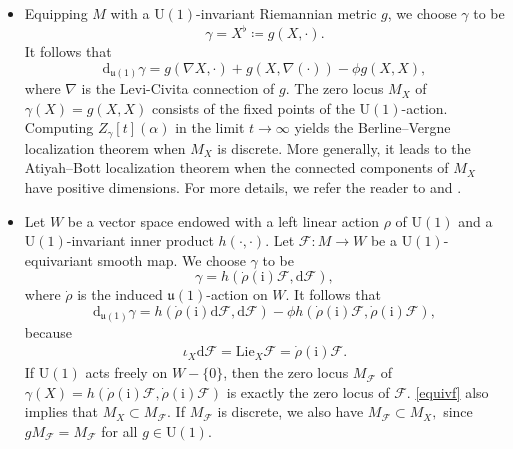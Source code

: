 \documentclass[12pt]{amsart}
\numberwithin{table}{section}
\numberwithin{equation}{section}
\theoremstyle{plain}
\newcommand{\U}{\mathrm{U}}
\newcommand{\du}{\mathrm{d}_{\mathfrak{u}(1)}}
\newcommand{\sF}{\mathcal{F}}
\begin{document}
\begin{itemize}
	\item Equipping $M$ with a $\U(1)$-invariant Riemannian metric $g$, we choose $\gamma$ to be
	\begin{equation}\label{gm1}
		\gamma = X^{\flat}\coloneqq g(X, \cdot).
	\end{equation}
	It follows that
	\[
	\du \gamma =  g(\nabla X, \cdot) + g(X, \nabla(\cdot)) - \phi g(X,X),
	\]
	where $\nabla$ is the Levi-Civita connection of $g$. The zero locus $M_X$ of $\gamma(X)=g(X,X)$ consists of the fixed points of the $\U(1)$-action. 
	Computing $Z_{\gamma}[t](\alpha)$ in the limit $t \to \infty$ yields the Berline--Vergne localization theorem \cite{berline1982classes} when $M_X$ is discrete. More generally, it leads to the Atiyah--Bott localization theorem \cite{atiyah1984moment} when the connected components of $M_X$ have positive dimensions. For more details, we refer the reader to \cite{alekseev2000notes} and \cite[Chapter~7]{berline2003heat}.
	
	\item Let $W$ be a vector space endowed with a left linear action $\rho$ of $\U(1)$ and a $\U(1)$-invariant inner product $h(\cdot,\cdot)$. Let $\mathcal{F}\colon M \rightarrow W$ be a $\U(1)$-equivariant smooth map. We choose $\gamma$ to be
	\begin{equation}\label{gm2}
		\gamma =  h(\dot{\rho}(\mathrm{i}) \mathcal{F}, \mathrm{d} \mathcal{F}),
	\end{equation}
	where $\dot{\rho}$ is the induced $\mathfrak{u}(1)$-action on $W$. It follows that
	\[
	\du \gamma = h(\dot{\rho}(\mathrm{i}) \mathrm{d} \mathcal{F}, \mathrm{d} \mathcal{F}) - \phi h(\dot{\rho}(\mathrm{i})\mathcal{F}, \dot{\rho}(\mathrm{i})\mathcal{F}),
	\]
	because 
	\begin{align}\label{equivf}
		\iota_X \mathrm{d} \mathcal{F} = \mathrm{Lie}_X \mathcal{F} = \dot{\rho}(\mathrm{i}) \mathcal{F}.
	\end{align}
	If $\U(1)$ acts freely on $W-\{0\}$, then the zero locus $M_{\mathcal{F}}$ of $\gamma(X)=h(\dot{\rho}(\mathrm{i})\mathcal{F}, \dot{\rho}(\mathrm{i})\mathcal{F})$ is exactly the zero locus of $\mathcal{F}$. \eqref{equivf} also implies that
	$
	M_{X} \subset M_{\sF}.
	$
	If $M_{\sF}$ is discrete, we also have
	$
	M_{\sF} \subset M_{X},
	$
	since $g M_{\sF} = M_{\sF}$ for all $g \in \U(1)$.
	

\end{itemize}
\end{document}
